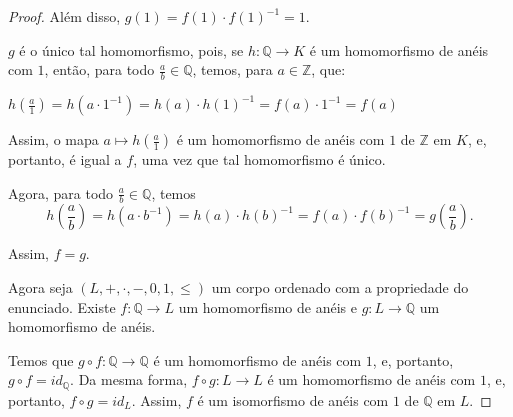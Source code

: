 \begin{proof}
    Além disso, $g(1)=f(1)\cdot f(1)^{-1}=1$.

    $g$ é o único tal homomorfismo, pois, se $h:\mathbb Q\to K$ é um homomorfismo de anéis com $1$, então, para todo $\frac{a}{b}\in\mathbb Q$, temos, para $a \in \mathbb Z$, que:

    $h\left(\frac{a}{1}\right) = h(a\cdot 1^{-1}) = h(a)\cdot h(1)^{-1} = f(a)\cdot 1^{-1} = f(a)$

    Assim, o mapa $a\mapsto h\left(\frac{a}{1}\right)$ é um homomorfismo de anéis com $1$ de $\mathbb Z$ em $K$, e, portanto, é igual a $f$, uma vez que tal homomorfismo é único.

    Agora, para todo $\frac{a}{b}\in\mathbb Q$, temos
    \[
        h\left(\frac{a}{b}\right) = h(a\cdot b^{-1}) = h(a)\cdot h(b)^{-1} = f(a)\cdot f(b)^{-1} = g\left(\frac{a}{b}\right).
    \]

    Assim, $f=g$.

    Agora seja $(L, +, \cdot, -, 0, 1, \leq)$ um corpo ordenado com a propriedade do enunciado.
    Existe $f:\mathbb Q\to L$ um homomorfismo de anéis e $g:L\rightarrow \mathbb Q$ um homomorfismo de anéis.

    Temos que $g\circ f:\mathbb Q\to \mathbb Q$ é um homomorfismo de anéis com $1$, e, portanto, $g\circ f = id_{\mathbb Q}$.
    Da mesma forma, $f\circ g:L\to L$ é um homomorfismo de anéis com $1$, e, portanto, $f\circ g = id_L$.
    Assim, $f$ é um isomorfismo de anéis com $1$ de $\mathbb Q$ em $L$.
\end{proof}